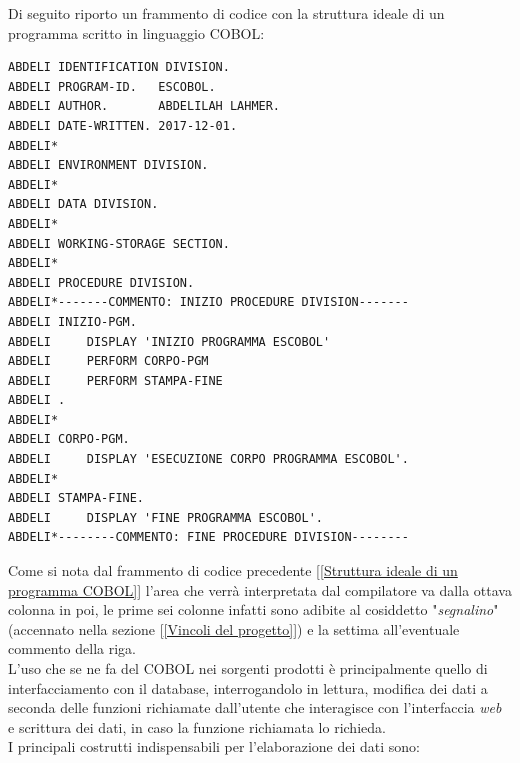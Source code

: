 Di seguito riporto un frammento di codice con la struttura ideale di un programma scritto in linguaggio COBOL:

\begin{lstlisting}[language=cobol, caption={Struttura ideale di un programma COBOL}, label={Struttura ideale di un programma COBOL}]
ABDELI IDENTIFICATION DIVISION.
ABDELI PROGRAM-ID.   ESCOBOL.
ABDELI AUTHOR.       ABDELILAH LAHMER.
ABDELI DATE-WRITTEN. 2017-12-01.
ABDELI*
ABDELI ENVIRONMENT DIVISION.
ABDELI*
ABDELI DATA DIVISION.
ABDELI*
ABDELI WORKING-STORAGE SECTION.                         
ABDELI*
ABDELI PROCEDURE DIVISION.
ABDELI*-------COMMENTO: INIZIO PROCEDURE DIVISION-------
ABDELI INIZIO-PGM.
ABDELI     DISPLAY 'INIZIO PROGRAMMA ESCOBOL'
ABDELI 	   PERFORM CORPO-PGM
ABDELI     PERFORM STAMPA-FINE
ABDELI .
ABDELI*
ABDELI CORPO-PGM.
ABDELI     DISPLAY 'ESECUZIONE CORPO PROGRAMMA ESCOBOL'.
ABDELI*
ABDELI STAMPA-FINE.
ABDELI     DISPLAY 'FINE PROGRAMMA ESCOBOL'.
ABDELI*--------COMMENTO: FINE PROCEDURE DIVISION--------
\end{lstlisting}

Come si nota dal frammento di codice precedente [\ref{Struttura ideale di un programma COBOL}] l'area che verrà interpretata dal compilatore va dalla ottava colonna in poi, le prime sei colonne infatti sono adibite al cosiddetto "\textit{segnalino}" (accennato nella sezione [\ref{Vincoli del progetto}]) e la settima all'eventuale commento della riga.\\


L'uso che se ne fa del COBOL nei sorgenti prodotti è principalmente quello di interfacciamento con il database, interrogandolo in lettura, modifica dei dati a seconda delle funzioni richiamate dall'utente che interagisce con l'interfaccia \textit{web} e scrittura dei dati, in caso la funzione richiamata lo richieda.\\

I principali costrutti indispensabili per l'elaborazione dei dati sono:

